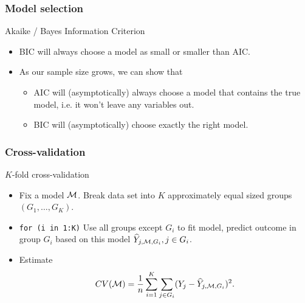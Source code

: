 \documentclass[handout]{beamer}
\begin{document}

   \begin{frame} \frametitle{Model selection}

   \begin{block}
   {Akaike / Bayes Information Criterion}

   \begin{itemize}[<+->]

   \item BIC will always choose a model as small or smaller
   than AIC.

   \item As our sample size grows, we can show that
   \begin{itemize}
   \item AIC will (asymptotically) always choose a model that contains
   the true model, i.e. it won't leave any variables out.
   \item BIC will (asymptotically) choose exactly the right model.
   \end{itemize}

   \end{itemize}
   \end{block}
   \end{frame}


   \begin{frame} \frametitle{Cross-validation}

   \begin{block}
   {$K$-fold cross-validation                     }
       \begin{itemize}

       \item Fix a model ${\cal M}$.
       Break data set into $K$ approximately equal sized groups $(G_1, \dots, G_K)$.

       \item {\tt for (i in 1:K)} Use all groups
       except $G_i$ to fit model, predict  outcome in group $G_i$ based on this model $\widehat{Y}_{j,{\cal M}, G_i}, j \in G_i$.

       \item Estimate
   $$
   CV({\cal M}) = \frac{1}{n}\sum_{i=1}^K \sum_{j \in G_i} (Y_j - \widehat{Y}_{j,{\cal M},G_i})^2.$$
       \end{itemize}

   \end{block}
   \end{frame}
\end{document}
